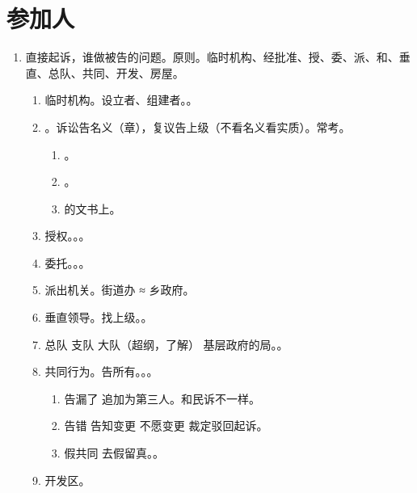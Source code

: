 \section{参加人}
\begin{enumerate}
  \item 直接起诉，谁做被告的问题。原则。临时机构、经批准、授、委、派、和、垂直、总队、共同、开发、房屋。
        \begin{enumerate}
          \item 临时机构。设立者、组建者。。
          \item {}。诉讼告名义（章），复议告上级（不看名义看实质）。常考。
                \begin{enumerate}
                  \item {}。
                  \item {}。
                  \item {}的文书上。
                \end{enumerate}
          \item 授权。。。
          \item 委托。。。
          \item 派出机关。街道办 ≈ 乡政府。
          \item 垂直领导。找上级。。
          \item 总队 \dy 支队 \dy 大队（超纲，了解） \ydy 基层政府的局。。
          \item 共同行为。告所有。。。
                \begin{enumerate}
                  \item 告漏了 \yjt 追加为第三人。和民诉不一样。
                  \item 告错 \yjt 告知变更 \yjt 不愿变更 \yjt 裁定驳回起诉。
                  \item 假共同 \yjt 去假留真。。
                \end{enumerate}
          \item 开发区。

\end{enumerate}
\end{enumerate}
